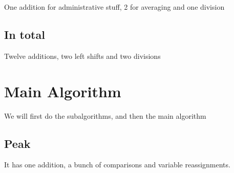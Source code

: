 \documentclass{article}
\begin{document}
One addition for administrative stuff, 2 for averaging and one division

\subsection{In total}
Twelve additions, two left shifts and two divisions
\section{Main Algorithm}
We will first do the subalgorithms, and then the main algorithm 
\subsection{Peak}
It has one addition, a bunch of comparisons and variable reassignments.
\end{document}
